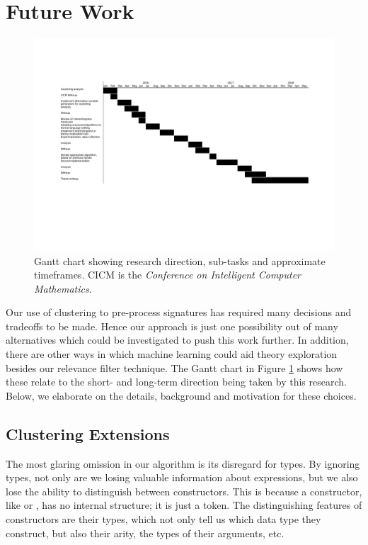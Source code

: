 \section{Future Work}
\label{sec:future}

\begin{figure}
  \centering
  \includegraphics[trim=3cm 2cm 3cm 2cm, width=1.00\textwidth]{Gantt.pdf}
  \caption{Gantt chart showing research direction, sub-tasks and approximate timeframes. CICM is the \emph{Conference on Intelligent Computer Mathematics}.}
  \label{fig:gantt}
\end{figure}

Our use of clustering to pre-process \qspec{} signatures has required many decisions and tradeoffs to be made. Hence our approach is just one possibility out of many alternatives which could be investigated to push this work further. In addition, there are other ways in which machine learning could aid theory exploration besides our relevance filter technique. The Gantt chart in Figure \ref{fig:gantt} shows how these relate to the short- and long-term direction being taken by this research. Below, we elaborate on the details, background and motivation for these choices.

\subsection{Clustering Extensions}
\label{sec:preprocessing}

The most glaring omission in our algorithm is its disregard for types. By ignoring types, not only are we losing valuable information about expressions, but we also lose the ability to distinguish between constructors. This is because a constructor, like  or , has no internal structure; it is just a token. The distinguishing features of constructors are their types, which not only tell us which data type they construct, but also their arity, the types of their arguments, etc.

